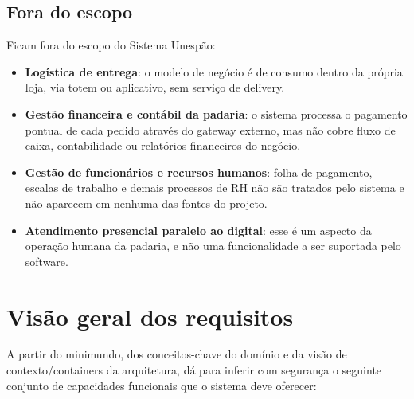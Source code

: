 \documentclass[a4paper,12pt,oneside,openany]{book}
\begin{document}
\subsection*{Fora do escopo}

Ficam fora do escopo do Sistema Unespão:

\begin{itemize}
    \item \textbf{Logística de entrega}: o modelo de negócio é de consumo dentro da própria loja, via totem ou aplicativo, sem serviço de delivery.
    \item \textbf{Gestão financeira e contábil da padaria}: o sistema processa o pagamento pontual de cada pedido através do gateway externo, mas não cobre fluxo de caixa, contabilidade ou relatórios financeiros do negócio.
    \item \textbf{Gestão de funcionários e recursos humanos}: folha de pagamento, escalas de trabalho e demais processos de RH não são tratados pelo sistema e não aparecem em nenhuma das fontes do projeto.
    \item \textbf{Atendimento presencial paralelo ao digital}: esse é um aspecto da operação humana da padaria, e não uma funcionalidade a ser suportada pelo software.
\end{itemize}

\section{Visão geral dos requisitos}

A partir do minimundo, dos conceitos-chave do domínio e da visão de contexto/containers da arquitetura, dá para inferir com segurança o seguinte conjunto de capacidades funcionais que o sistema deve oferecer:
\end{document}
